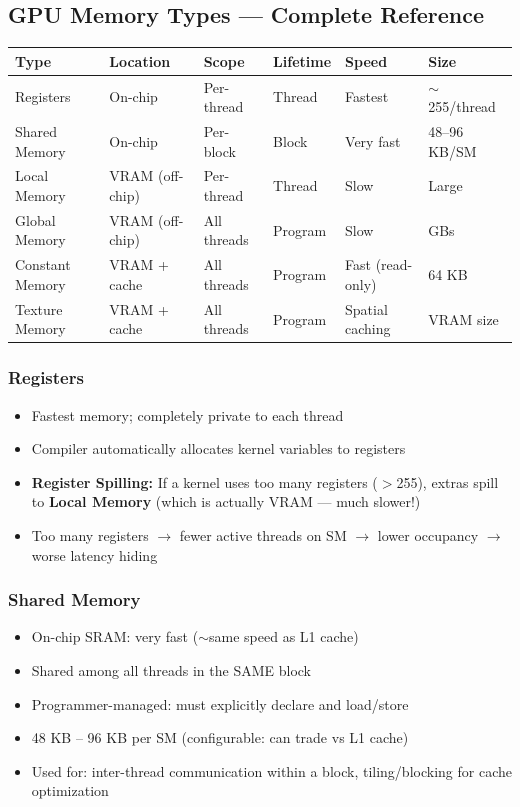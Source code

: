\documentclass[11pt,a4paper]{article}
\newcommand{\term}[1]{\textbf{\color{darkblue}#1}}
\begin{document}
\subsection{GPU Memory Types --- Complete Reference}

\begin{center}
\begin{tabular}{L{3cm} C{2cm} L{2.5cm} L{2.5cm} L{2cm} L{2cm}}
\toprule
\textbf{Type} & \textbf{Location} & \textbf{Scope} & \textbf{Lifetime} & \textbf{Speed} & \textbf{Size} \\
\midrule
Registers & On-chip & Per-thread & Thread & Fastest & $\sim$255/thread \\
Shared Memory & On-chip & Per-block & Block & Very fast & 48--96 KB/SM \\
Local Memory & VRAM (off-chip) & Per-thread & Thread & Slow & Large \\
Global Memory & VRAM (off-chip) & All threads & Program & Slow & GBs \\
Constant Memory & VRAM + cache & All threads & Program & Fast (read-only) & 64 KB \\
Texture Memory & VRAM + cache & All threads & Program & Spatial caching & VRAM size \\
\bottomrule
\end{tabular}
\end{center}

\subsubsection{Registers}
\begin{itemize}[noitemsep]
  \item Fastest memory; completely private to each thread
  \item Compiler automatically allocates kernel variables to registers
  \item \term{Register Spilling:} If a kernel uses too many registers ($>$255), extras spill to \textbf{Local Memory} (which is actually VRAM --- much slower!)
  \item Too many registers $\to$ fewer active threads on SM $\to$ lower occupancy $\to$ worse latency hiding
\end{itemize}

\subsubsection{Shared Memory}
\begin{itemize}[noitemsep]
  \item On-chip SRAM: very fast ($\sim$same speed as L1 cache)
  \item Shared among all threads in the SAME block
  \item Programmer-managed: must explicitly declare and load/store
  \item 48 KB -- 96 KB per SM (configurable: can trade vs L1 cache)
  \item Used for: inter-thread communication within a block, tiling/blocking for cache optimization
\end{itemize}
\end{document}
